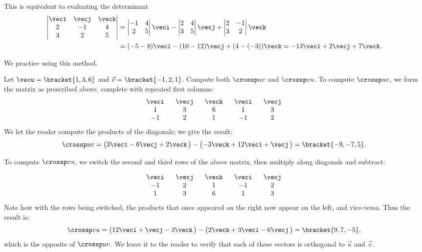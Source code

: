 This is equivalent to evaluating the determinant
\begin{align*}
 \begin{vmatrix}\veci&\vecj&\veck\\2&-1&4\\3&2&5\end{vmatrix}
 &=\begin{vmatrix}-1&4\\2&5\end{vmatrix}\veci
 -\begin{vmatrix}2&4\\3&5\end{vmatrix}\vecj
 +\begin{vmatrix}2&-1\\3&2\end{vmatrix}\veck \\
 &=(-5-8)\veci-(10-12)\vecj+(4-(-3))\veck
 =-13\veci+2\vecj+7\veck.
\end{align*}

We practice using this method.

\begin{example}\label{ex_crossp2}
Let $\vecu=\bracket{1,3,6}$ and $\vec v = \bracket{-1,2,1}$. Compute both $\crossp uv$ and $\crossp vu$.
\solution
To compute $\crossp uv$, we form the matrix as prescribed above, complete with repeated first columns:
\[\begin{array}{ccccc} \ \veci\ &\ \vecj\ &\ \veck\ &\ \veci\ &\ \vecj\ \\  1&3&6&1&3\\ -1&2&1&-1&2\end{array}\]
We let the reader compute the products of the diagonals; we give the result:
\[\crossp uv = \bigl(3\veci-6\vecj+2\veck\,\bigr) - \bigl(-3\veck + 12\veci+\vecj\,\bigr) = \bracket{-9,-7,5}.\]

To compute $\crossp vu$, we switch the second and third rows of the above matrix, then multiply along diagonals and subtract:

\[\begin{array}{ccccc} \ \veci\ &\ \vecj\ &\ \veck\ &\ \veci\ &\ \vecj\ \\ -1&2&1&-1&2\\  1&3&6&1&3\end{array}\]
Note how with the rows being switched, the products that once appeared on the right now appear on the left, and vice-versa. Thus the result is:
\[\crossp vu = \bigl(12\veci+\vecj-3\veck\,\bigr) - \bigl(2\veck + 3\veci-6\vecj\,\bigr) = \bracket{9,7,-5},\]
which is the opposite of $\crossp uv$. We leave it to the reader to verify that each of these vectors is orthogonal to $\vec u$ and $\vec v$.
\end{example}

